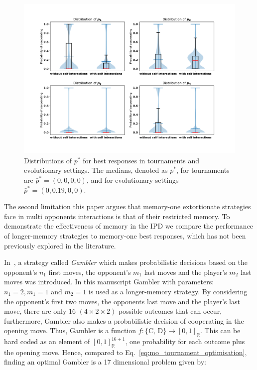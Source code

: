 \documentclass[10pt]{article}
\newcommand{\R}{\mathbb{R}}
\begin{document}
\begin{figure}[!htbp]
    \centering
    \includegraphics[width=.9\textwidth]{img/behaviour_violin_plots.pdf}
    \caption{Distributions of \(p^*\) for best responses in tournaments and
    evolutionary settings. The medians, denoted as \(\bar{p}^*\), for tournaments
    are \(\bar{p}^* = (0, 0, 0, 0)\), and for evolutionary settings
    \(\bar{p}^* = (0, 0.19, 0, 0)\).}
    \label{fig:behaviour_violin_plots}
\end{figure}

The second limitation this paper argues that memory-one extortionate strategies
face in multi opponents interactions is that of their restricted memory. To demonstrate
the effectiveness of memory in the IPD we compare the performance of longer-memory
strategies to memory-one best responses, which has not been previously explored
in the literature.

In~\cite{Harper2017}, a strategy called \textit{Gambler} which makes
probabilistic decisions based on the opponent's \(n_1\) first moves, the
opponent's \(m_1\) last moves and the player's \(m_2\) last moves was
introduced. In this manuscript Gambler with parameters: $n_1 = 2, m_1 = 1$ and $m_2 = 1$ is used
as a longer-memory strategy.
By considering the opponent's first two moves, the opponents last move and the
player's last move, there are only 16 $(4 \times 2 \times 2)$ possible outcomes
that can occur, furthermore, Gambler also makes a probabilistic decision of
cooperating in the opening move. Thus, Gambler is a function \(f: \{\text{C,
D}\} \rightarrow [0, 1]_{\R}\). This can be hard coded as an element
of \([0, 1]_{\R} ^ {16 + 1}\), one probability for each outcome plus the opening
move. Hence, compared to Eq.~\ref{eq:mo_tournament_optimisation}, finding an
optimal Gambler is a 17 dimensional problem given by:
\end{document}
